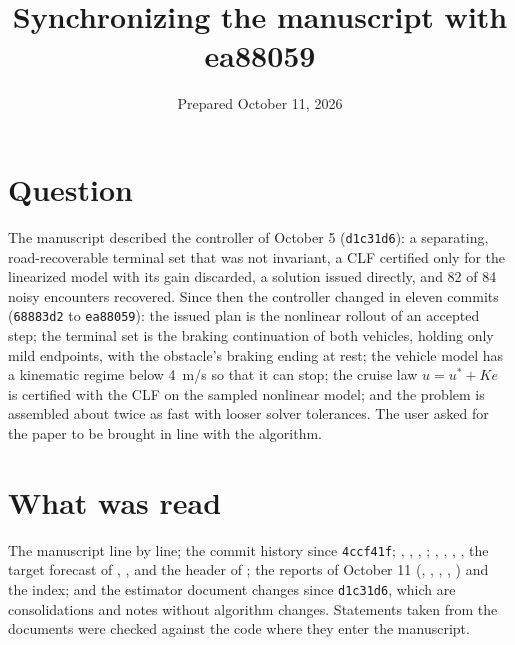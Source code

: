 \documentclass[11pt]{article}
\title{Synchronizing the manuscript with ea88059}
\date{Prepared October 11, 2026}
\begin{document}
\maketitle

\section{Question}
The manuscript  described the controller of
October 5 (\texttt{d1c31d6}): a separating, road-recoverable terminal set
that was not invariant, a CLF certified only for the linearized model with
its gain discarded, a solution issued directly, and 82 of 84 noisy
encounters recovered. Since then the controller changed in eleven commits
(\texttt{68883d2} to \texttt{ea88059}): the issued plan is the nonlinear
rollout of an accepted step; the terminal set is the braking continuation of
both vehicles, holding only mild endpoints, with the obstacle's braking
ending at rest; the vehicle model has a kinematic regime below 4~m/s so that
it can stop; the cruise law $u=u^*+Ke$ is certified with the CLF on the
sampled nonlinear model; and the problem is assembled about twice as fast
with looser solver tolerances. The user asked for the paper to be brought in
line with the algorithm.

\section{What was read}
The manuscript line by line; the commit history since \texttt{4ccf41f};
, ,
, ;
, ,
, ,
the target forecast of ,
, 
and the header of ; the reports of
October 11 (,
, ,
, ) and the
index; and the estimator document changes since \texttt{d1c31d6}, which are
consolidations and notes without algorithm changes. Statements taken from
the documents were checked against the code where they enter the manuscript.
\end{document}
